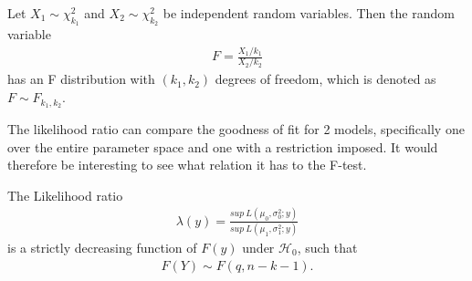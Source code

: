 \begin{definition}[F Distribution]
    Let $X_1 \sim \chi_{k_1}^2$ and $X_2 \sim \chi_{k_2}^2$ be independent random variables. Then the random variable 
        \begin{align*}
            F = \frac{X_1/k_1}{X_2/k_2}
        \end{align*}
    has an F distribution with $(k_1, k_2)$ degrees of freedom, which is denoted as $F \sim F_{k_1, k_2}$.
\end{definition}

The likelihood ratio can compare the goodness of fit for 2 models, specifically one over the entire parameter space and one with a restriction imposed.
It would therefore be interesting to see what relation it has to the F-test.

\begin{theorem}
\label{th:Likelihood_ratio_linear_models}
    The Likelihood ratio
    \begin{align*}
        \lambda(y) = \frac{sup \ L(\mu_0, \sigma_0^2; y)}{sup \ L(\mu_1, \sigma_1^2; y)}
    \end{align*}
    is a strictly decreasing function of $F(y)$ under $\mathcal{H}_0$, such that
    \begin{align*}
        F(Y) \sim F(q, n-k-1).
    \end{align*}
\end{theorem}

